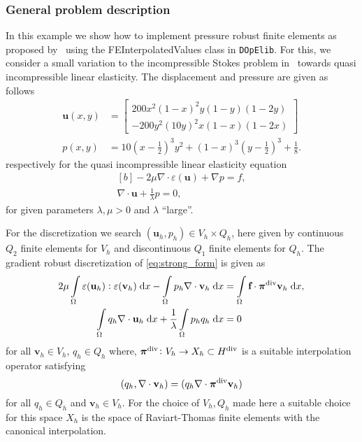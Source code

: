 \subsubsection{General problem description}
 In this example we show how to implement pressure robust finite elements
 as proposed by~\cite{Linke:2014} using the
 FEInterpolatedValues class in \texttt{DOpElib}.
 For this, we consider a small variation to the incompressible
 Stokes problem in~\cite{Linke:2014} towards quasi incompressible
 linear elasticity. The displacement and pressure are given as follows
 \begin{align*}
   \textbf{u}(x, y) & = \begin{bmatrix}
 		    200 x^2 (1-x)^2y(1-y)(1-2y) \\
 		    -200 y^2(10y)^2x(1-x)(1-2x)
 	  	   \end{bmatrix} \\
   p(x,y) & = 10\left(x - \frac{1}{2}\right)^3y^2 + (1-x)^3\left(y-\frac{1}{2}\right)^3 + \frac{1}{8}.
 \end{align*}
 respectively for the quasi incompressible linear elasticity equation
 \begin{equation}
   \begin{aligned}[b] \label{eq:strong_form}
     -2\mu \nabla \! \cdot \! \varepsilon(\textbf{u}) + \nabla p = f, \\
     \nabla \cdot \textbf{u} + \frac{1}{\lambda} p = 0,
   \end{aligned}
 \end{equation}
 for given parameters $\lambda, \mu > 0$ and $\lambda$ ``large''.

 For the discretization we search $(\textbf{u}_h,p_h) \in V_h \times Q_h$,
 here given by continuous $Q_2$ finite elements for $V_h$ and discontinuous
 $Q_1$ finite elements for $Q_h$.
 The gradient robust discretization of \eqref{eq:strong_form} is given as
  \begin{align}
   2\mu \int\limits_\Omega \varepsilon(\textbf{u}_h) : \varepsilon(\textbf{v}_h) \; \mathrm{d} x - 
   \int\limits_\Omega p_h \nabla \cdot \textbf{v}_h \; \mathrm{d} x & = \int\limits_\Omega \textbf{f} \cdot  \bm{\pi}^{\rm{div}} \textbf{v}_h \; \mathrm{d} x  \label{eq:modified_weak_form} , \\
   \int\limits_\Omega q_h \nabla \cdot \textbf{u}_h \; \mathrm{d} x  + \dfrac{1}{\lambda}\int\limits_\Omega p_hq_h \; \mathrm{d} x  & = 0  \label{eq:nearly_incompress_modified}
 \end{align}
 for all $\textbf{v}_h \in V_h$, $q_h \in Q_h$
 where, $\bm{\pi}^{\rm{div}} \colon V_h\rightarrow X_h \subset H^{\rm{div}}$
 is a suitable interpolation operator satisfying
 \[
 (q_h, \nabla \cdot \textbf{v}_h) = (q_h \nabla \cdot \bm{\pi}^{\rm{div}}\textbf{v}_h) 
 \]
 for all $q_h \in Q_h$ and $\textbf{v}_h \in V_h$. For the choice of $V_h,Q_h$ made here a
 suitable choice for this space $X_h$ is the space of Raviart-Thomas finite elements
 with the canonical interpolation.

